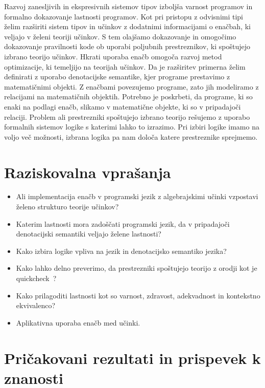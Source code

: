 \documentclass{article}
\begin{document}
Razvoj zanesljivih in ekspresivnih sistemov tipov izboljša varnost programov in  formalno dokazovanje lastnosti programov. Kot pri pristopu z odvisnimi tipi~\cite{DBLP:journals/pacmpl/Ahman18} želim razširiti sistem tipov in učinkov z dodatnimi informacijami o enačbah, ki veljajo v želeni teoriji učinkov. S tem olajšamo dokazovanje in omogočimo dokazovanje pravilnosti kode ob uporabi poljubnih prestreznikov, ki spoštujejo izbrano teorijo učinkov. Hkrati uporaba enačb omogoča razvoj metod optimizacije, ki temeljijo na teorijah učinkov. Da je razširitev primerna želim definirati z uporabo denotacijske semantike, kjer programe prestavimo z matematičnimi objekti. Z enačbami povezujemo programe, zato jih modeliramo z relacijami na matematičnih objektih. Potrebno je poskrbeti, da programe, ki so enaki na podlagi enačb, slikamo v matematične objekte, ki so v pripadajoči relaciji. Problem ali prestrezniki spoštujejo izbrano teorijo rešujemo z uporabo formalnih sistemov logike s katerimi lahko to izrazimo. Pri izbiri logike imamo na voljo več možnosti, izbrana logika pa nam določa katere prestreznike sprejmemo. 

\section*{Raziskovalna vprašanja}

\begin{itemize}
  \item Ali implementacija enačb v programski jezik z algebrajskimi učinki vzpostavi želeno strukturo teorije učinkov?
  \item Katerim lastnosti mora zadoščati programski jezik, da v pripadajoči denotacijski semantiki veljajo želene lastnosti?
  \item Kako izbira logike vpliva na jezik in denotacijsko semantiko jezika?
  \item Kako lahko delno preverimo, da prestrezniki spoštujejo teorijo z orodji kot je quickcheck~\cite{DBLP:conf/icfp/ClaessenH00}?
  \item Kako prilagoditi lastnosti kot so varnost, zdravost, adekvadnost in kontekstno ekvivalenco?
  \item Aplikativna uporaba enačb med učinki.
\end{itemize}

\section*{Pričakovani rezultati in prispevek k znanosti}
\end{document}
